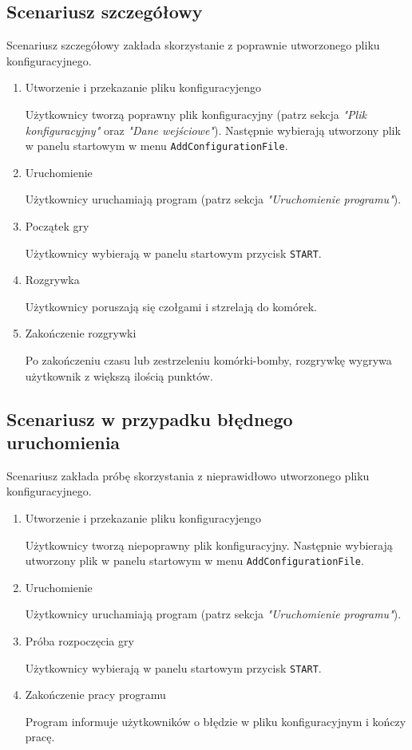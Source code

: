 \documentclass[a4paper]{article}
\begin{document}
\subsection{Scenariusz szczeg\'o\l{}owy}
\quad Scenariusz szczeg\'o\l{}owy zak\l{}ada skorzystanie z poprawnie utworzonego pliku konfiguracyjnego.
\begin{enumerate}
    \item Utworzenie i przekazanie pliku konfiguracyjengo
    
        U\.zytkownicy tworz\k{a} poprawny plik konfiguracyjny (patrz sekcja \textit{"Plik konfiguracyjny"} oraz \textit{"Dane wej\'sciowe"}). Nast\k{e}pnie wybieraj\k{a} utworzony plik w panelu startowym w menu \texttt{AddConfigurationFile}.
    \item Uruchomienie
    
        U\.zytkownicy uruchamiaj\k{a} program (patrz sekcja \textit{"Uruchomienie programu"}).
    \item Pocz\k{a}tek gry
    
        U\.zytkownicy wybieraj\k{a} w panelu startowym przycisk \texttt{START}.
    \item Rozgrywka
    
        U\.zytkownicy poruszaj\k{a} si\k{e} czo\l{}gami i stzrelaj\k{a} do kom\'orek.
    \item Zako\'nczenie rozgrywki
    
        Po zako\'nczeniu czasu lub zestrzeleniu kom\'orki-bomby, rozgrywk\k{e} wygrywa u\.zytkownik z wi\k{e}ksz\k{a} ilo\'sci\k{a} punkt\'ow.
\end{enumerate}

\subsection{Scenariusz w przypadku b\l{}\k{e}dnego uruchomienia}
\quad Scenariusz zak\l{}ada pr\'ob\k{e} skorzystania z nieprawid\l{}owo utworzonego pliku konfiguracyjnego.
\begin{enumerate}
    \item Utworzenie i przekazanie pliku konfiguracyjengo
    
        U\.zytkownicy tworz\k{a} niepoprawny plik konfiguracyjny. Nast\k{e}pnie wybieraj\k{a} utworzony plik w panelu startowym w menu \texttt{AddConfigurationFile}.
    \item Uruchomienie
    
        U\.zytkownicy uruchamiaj\k{a} program (patrz sekcja \textit{"Uruchomienie programu"}).
    \item Pr\'oba rozpocz\k{e}cia gry
    
        U\.zytkownicy wybieraj\k{a} w panelu startowym przycisk \texttt{START}.
    \item Zako\'nczenie pracy programu
    
        Program informuje u\.zytkownik\'ow o b\l{}\k{e}dzie w pliku konfiguracyjnym i ko\'nczy prac\k{e}.
\end{enumerate}
\end{document}
